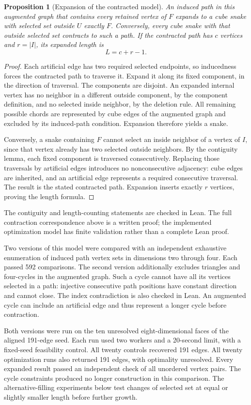 \documentclass[11pt,a4paper]{article}
\newtheorem{proposition}[theorem]{Proposition}
\theoremstyle{definition}
\theoremstyle{remark}
\begin{document}
\begin{proposition}[Expansion of the contracted model]
An induced path in this augmented graph that contains every retained vertex of $F$ expands to a cube snake with selected set outside $U$ exactly $F$. Conversely, every cube snake with that outside selected set contracts to such a path. If the contracted path has $c$ vertices and $r=|I|$, its expanded length is
\[
L=c+r-1.
\]
\end{proposition}
\begin{proof}
Each artificial edge has two required selected endpoints, so inducedness forces the contracted path to traverse it. Expand it along its fixed component, in the direction of traversal. The components are disjoint. An expanded internal vertex has no neighbor in a different outside component, by the component definition, and no selected inside neighbor, by the deletion rule. All remaining possible chords are represented by cube edges of the augmented graph and excluded by its induced-path condition. Expansion therefore yields a snake.

Conversely, a snake containing $F$ cannot select an inside neighbor of a vertex of $I$, since that vertex already has two selected outside neighbors. By the contiguity lemma, each fixed component is traversed consecutively. Replacing those traversals by artificial edges introduces no nonconsecutive adjacency: cube edges are inherited, and an artificial edge represents a required consecutive traversal. The result is the stated contracted path. Expansion inserts exactly $r$ vertices, proving the length formula.
\end{proof}

The contiguity and length-counting statements are checked in Lean. The full contraction correspondence above is a written proof; the implemented optimization model has finite validation rather than a complete Lean proof.

Two versions of this model were compared with an independent exhaustive enumeration of induced path vertex sets in dimensions two through four. Each passed 592 comparisons. The second version additionally excludes triangles and four-cycles in the augmented graph. Such a cycle cannot have all its vertices selected in a path: injective consecutive path positions have constant direction and cannot close. The index contradiction is also checked in Lean. An augmented cycle can include an artificial edge and thus represent a longer cycle before contraction.

Both versions were run on the ten unresolved eight-dimensional faces of the aligned 191-edge seed. Each run used two workers and a 20-second limit, with a fixed-seed feasibility control. All twenty controls recovered 191 edges. All twenty optimization runs also returned 191 edges, with optimality unresolved. Every expanded result passed an independent check of all unordered vertex pairs. The cycle constraints produced no longer construction in this comparison. The alternative-filling experiments below test changes of selected set at equal or slightly smaller length before further growth.
\end{document}
